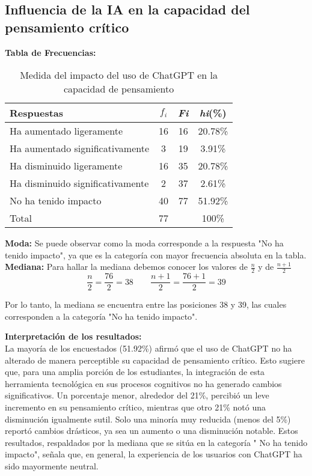 \subsection{Influencia de la IA en la capacidad del pensamiento crítico}
\textbf{Tabla de Frecuencias:}
\begin{table}[H]
	\centering
	\renewcommand{\arraystretch}{1.2}
	\begin{tabular}{l c c c}
		\hline
		{Respuestas} & {\(f_i\)} & \textit{Fi} & \textit{hi}(\%)\\
		\hline
		Ha aumentado ligeramente       & 16 & 16 & 20.78\%\\
		Ha aumentado significativamente & 3  & 19 & 3.91\%\\
		Ha disminuido ligeramente       & 16 & 35 & 20.78\%\\
		Ha disminuido significativamente & 2  & 37 & 2.61\%\\
		No ha tenido impacto            & 40 & 77 & 51.92\%\\
		\hline
		Total                           & 77 &    & 100\%\\
		\hline
	\end{tabular}
	\caption{Medida del impacto del uso de ChatGPT en la capacidad de pensamiento }
	\label{tabla:pensamientoCritico}
\end{table}
\textbf{Moda:} Se puede observar como la moda corresponde a la respuesta "No ha tenido impacto", ya que es la categoría con mayor frecuencia absoluta en la tabla.\\

\textbf{Mediana:} Para hallar la mediana debemos conocer los valores de $\frac{n}{2}$ y de $\frac{n + 1}{2}$\\
\[
\frac{n}{2} = \frac{76}{2} = 38 \qquad \frac{n+1}{2} = \frac{76+1}{2} = 39
\]

Por lo tanto, la mediana se encuentra entre las posiciones 38 y 39, las cuales corresponden a la categoría "No ha tenido impacto".

\textbf{Interpretación de los resultados:}\\
La mayoría de los encuestados (51.92\%) afirmó que el uso de ChatGPT no ha alterado de manera perceptible su capacidad de pensamiento crítico. Esto sugiere que, para una amplia porción de los estudiantes, la integración de esta herramienta tecnológica en sus procesos cognitivos no ha generado cambios significativos. Un porcentaje menor, alrededor del 21\%, percibió un leve incremento en su pensamiento crítico, mientras que otro 21\% notó una disminución igualmente sutil. Solo una minoría muy reducida (menos del 5\%) reportó cambios drásticos, ya sea un aumento o una disminución notable. Estos resultados, respaldados por la mediana que se sitúa en la categoría " No ha tenido impacto", señala que, en general, la experiencia de los usuarios con ChatGPT ha sido mayormente neutral.
